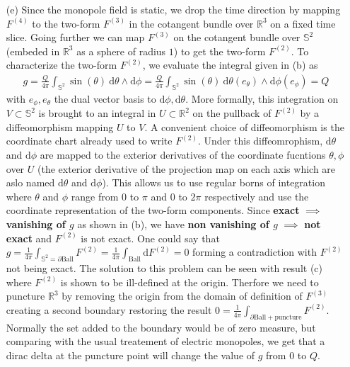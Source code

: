 \documentclass[10pt, a4paper]{article}
\begin{document}
{\begin{enumerate}
\begin{align*}
  \end{align*}
  We note the electric field components (associated to $\text{d}x^{i} \wedge \text{d}t$) all vanish and we only have a magnetic field (associated to $\text{d}x^i \wedge \text{d}x^j$). The magnetic field has the same from has an electric monopole (inverse square law multiplies by a unit "vector").
  \item[(e)] Since the monopole field is static, we drop the time direction by mapping $F^{(4)}$ to the two-form $F^{(3)}$ in the cotangent bundle over $\mathbb{R}^3$ on a fixed time slice. Going further we can map $F^{(3)}$ on the cotangent bundle over $\mathbb{S}^2$ (embeded in $\mathbb{R}^3$ as a sphere of radius $1$) to get the two-form $F^{(2)}$. To characterize the two-form $F^{(2)}$, we evaluate the integral given in (b) as 
  \begin{align*}
  g = \frac{Q}{4\pi}\int_{\mathbb{S}^2} \sin(\theta) \ \text{d} \theta \wedge \text{d}\phi = \frac{Q}{4\pi}\int_{\mathbb{S}^2} \sin(\theta) \ \text{d} \theta (e_\theta) \wedge \text{d}\phi (e_\phi) = Q
  \end{align*}
  with $e_{\phi}, e_\theta$ the dual vector basis to $\text{d} \phi, \text{d} \theta$. More formally, this integration on $V\subset\mathbb{S}^2$ is brought to an integral in $U\subset\mathbb{R}^2$ on the pullback of $F^{(2)}$ by a diffeomorphism mapping $U$ to $V$. A convenient choice of diffeomorphism is the coordinate chart already used to write $F^{(2)}$. Under this diffeomrophism, $\text{d}\theta$ and $\text{d}\phi$ are mapped to the exterior derivatives of the coordinate fucntions $\theta, \phi$ over $U$ (the exterior derivative of the projection map on each axis which are aslo named $\text{d}\theta$ and $\text{d}\phi$). This allows us to use regular borns of integration where $\theta$ and $\phi$ range from $0$ to $\pi$ and $0$ to $2\pi$ respectively and use the coordinate representation of the two-form components. Since \textbf{exact} $\implies$ \textbf{vanishing of $g$} as shown in (b), we have \textbf{non vanishing of $g$} $\implies$ \textbf{not exact} and $F^{(2)}$ is not exact. One could say that $g= \frac{1}{4\pi} \int_{\mathbb{S}^2 = \partial \text{Ball}} F^{(2)} = \frac{1}{4\pi} \int_{\text{Ball}} \text{d}F^{(2)} = 0$ forming a contradiction with $F^{(2)}$ not being exact. The solution to this problem can be seen with result (c) where $F^{(2)}$ is shown to be ill-defined at the origin. Therfore we need to puncture $\mathbb{R}^3$ by removing the origin from the domain of definition of $F^{(3)}$ creating a second boundary restoring the result $0 = \frac{1}{4\pi} \int_{\partial \text{Ball} + \text{puncture}} F^{(2)}$. Normally the set added to the boundary would be of zero measure, but comparing with the usual treatement of electric monopoles, we get that a dirac delta at the puncture point will change the value of $g$ from $0$ to $Q$. 

\end{enumerate}}
\end{document}
